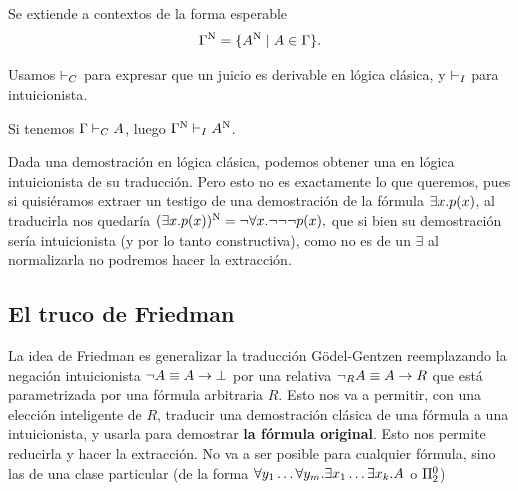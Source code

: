\begin{definition}
    Se extiende a contextos de la forma esperable
    \[
        \Gamma^{\text{N}} = \{A^{\text{N}} \mid A \in \Gamma \}.
    \]
\end{definition}

\begin{notation*}
    Usamos $\vdash_C$ para expresar que un juicio es derivable en lógica clásica,
    y $\vdash_I$ para intuicionista.
\end{notation*}

\begin{theorem}
    Si tenemos $\Gamma \vdash_C A$, luego $\Gamma^{\text{N}} \vdash_I A^{\text{N}}$.
\end{theorem}

Dada una demostración en lógica clásica, podemos obtener una en lógica
intuicionista de su traducción. Pero esto no es exactamente lo que queremos,
pues si quisiéramos extraer un testigo de una demostración de la fórmula
$\exists x. p(x)$, al traducirla nos quedaría
\(
    (\exists x. p(x))^{\text{N}}
        = \neg \forall x . \neg\neg\neg p(x),
\)
que si bien su demostración sería intuicionista (y por lo tanto constructiva),
como no es de un $\exists$ al normalizarla no podremos hacer la extracción.

\subsection{El truco de Friedman}

La idea de Friedman \cite{miquel-friedman} es generalizar la traducción
Gödel-Gentzen reemplazando la negación intuicionista $\neg A \equiv A
\rightarrow \bot$ por una relativa $\neg_R A \equiv A \rightarrow R$ que
está parametrizada por una fórmula arbitraria $R$. Esto nos va a permitir, con
una elección inteligente de $R$, traducir una demostración clásica de una
fórmula a una intuicionista, y usarla para demostrar \textbf{la fórmula
original}. Esto nos permite reducirla y hacer la extracción. No va a ser posible para cualquier fórmula, sino las de una clase particular (de la forma 
$\forall y_1 \dots \forall y_m . \exists x_1 \dots \exists x_k . A$ o $\Pi^0_{2}$)

